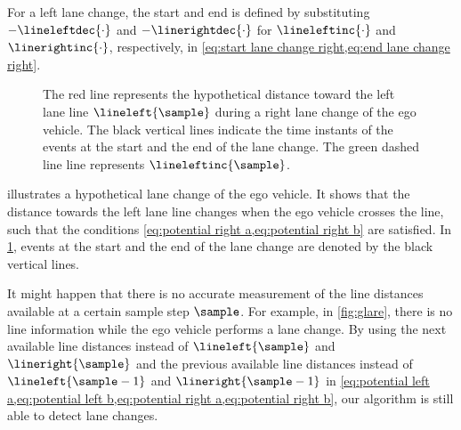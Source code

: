 For a left lane change, the start and end is defined by substituting $-\lineleftdec{\cdot}$ and $-\linerightdec{\cdot}$ for $\lineleftinc{\cdot}$ and $\linerightinc{\cdot}$, respectively, in \cref{eq:start lane change right,eq:end lane change right}.
\cenda

\setlength{\figurewidth}{\linewidth}
\setlength{\figureheight}{0.6\linewidth}
\begin{figure}
	\centering
	
	\caption{\cstarta The red line represents the hypothetical distance toward the left lane line $\lineleft{\sample}$ during a right lane change of the ego vehicle. The black vertical lines indicate the time instants of the events at the start and the end of the lane change. The green dashed line line represents $\lineleftinc{\sample}$.\cenda}
	\label{fig:ego lane change}
\end{figure}

\cstarta
{} illustrates a hypothetical lane change of the ego vehicle. 
It shows that the distance towards the left lane line changes when the ego vehicle crosses the line, such that the conditions \cref{eq:potential right a,eq:potential right b} are satisfied. In \cref{fig:ego lane change}, events at the start and the end of the lane change are denoted by the black vertical lines.

\begin{remark}
	It might happen that there is no accurate measurement of the line distances available at a certain sample step $\sample$. For example, in \cref{fig:glare}, there is no line information while the ego vehicle performs a lane change. By using the next available line distances instead of $\lineleft{\sample}$ and $\lineright{\sample}$ and the previous available line distances instead of $\lineleft{\sample-1}$ and $\lineright{\sample-1}$ in \cref{eq:potential left a,eq:potential left b,eq:potential right a,eq:potential right b}, our algorithm is still able to detect lane changes.
\end{remark}
\cenda

